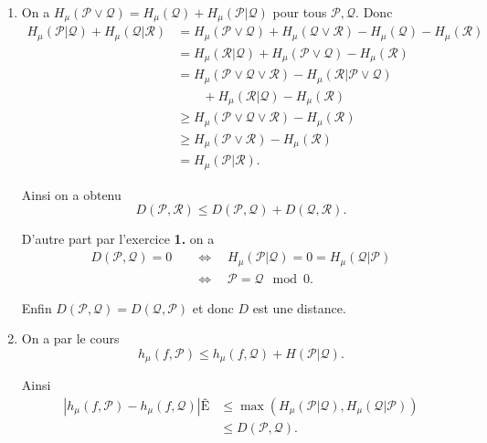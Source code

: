 \documentclass[a4paper,12pt,openany]{article}
\theoremstyle{plain}
\theoremstyle{definition}
\newcommand{\Pcal}{\mathcal{P}}
\newcommand{\Qcal}{\mathcal{Q}}
\newcommand{\Rcal}{\mathcal{R}}
\begin{document}
\begin{enumerate}
\item On a $H_\mu(\Pcal \vee \Qcal) = H_\mu(\Qcal) + H_\mu(\Pcal|\Qcal)$ pour tous $\Pcal, \Qcal$.  Donc 
$$
\begin{aligned}
H_\mu(\Pcal|\Qcal) + H_\mu(\Qcal|\Rcal) &= H_\mu(\Pcal \vee \Qcal) + H_\mu(\Qcal \vee \Rcal) - H_\mu(\Qcal) - H_\mu(\Rcal)  \\
&= H_\mu(\Rcal|\Qcal) + H_\mu(\Pcal \vee \Qcal) - H_\mu(\Rcal)  \\
&= H_\mu(\Pcal \vee \Qcal \vee \Rcal) - H_\mu(\Rcal|\Pcal \vee \Qcal) \\ 
&\quad \quad  + H_\mu(\Rcal|\Qcal) - H_\mu(\Rcal)  \\
&\geqslant H_\mu(\Pcal \vee \Qcal \vee \Rcal) - H_\mu(\Rcal)  \\
&\geqslant H_\mu(\Pcal \vee \Rcal) - H_\mu(\Rcal)  \\
&= H_\mu(\Pcal|\Rcal).
\end{aligned}
$$
 
Ainsi on a obtenu
$$
D(\Pcal, \Rcal) \leqslant D(\Pcal, \Qcal) + D(\Qcal, \Rcal).
$$

D'autre part par l'exercice \textbf{1.} on a
$$
\begin{aligned}
D(\Pcal, \Qcal) = 0 \quad &\iff \quad H_\mu(\Pcal|\Qcal) = 0 = H_\mu(\Qcal|\Pcal)  \\
&\iff \quad \Pcal = \Qcal \mod 0.
\end{aligned}
$$





Enfin $D(\Pcal, \Qcal) = D(\Qcal, \Pcal)$ et donc $D$ est une distance.
 \item On a par le cours
$$
h_\mu(f, \Pcal) \leqslant h_\mu(f, \Qcal) + H(\Pcal|\Qcal).
$$

Ainsi
$$
\begin{aligned}
\left|h_\mu(f, \Pcal)-h_\mu(f,\Qcal)\right|Ê&\leqslant  \max(H_\mu(\Pcal|\Qcal), H_\mu(\Qcal|\Pcal)) \\
&\leqslant D(\Pcal, \Qcal).
\end{aligned}
$$

\end{enumerate}
\vspace{0.6cm}
\end{document}
